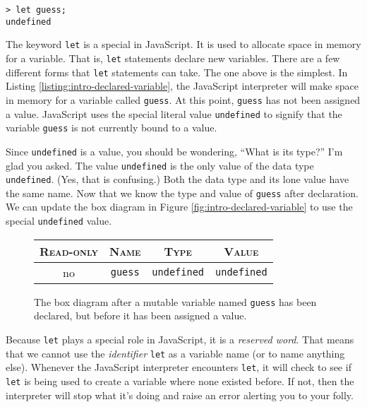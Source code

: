 \begin{lstlisting}[caption={\label{listing:intro-declared-variable} The NodeJS syntax to create a mutable variable named \texttt{guess}. The result is a value whose box diagram is \ref{fig:intro-declared-variable}.}]
> let guess;
undefined
\end{lstlisting}

The keyword \texttt{let} is a special in JavaScript. It is used to allocate space in memory for a variable. That is, \texttt{let} statements declare new variables. There are a few different forms that \texttt{let} statements can take. The one above is the simplest. In Listing \ref{listing:intro-declared-variable}, the JavaScript interpreter will make space in memory for a variable called \texttt{guess}. At this point, \texttt{guess} has not been assigned a value. JavaScript uses the special literal value \texttt{undefined} to signify that the variable \texttt{guess} is not currently bound to a value.

Since \texttt{undefined} is a value, you should be wondering, ``What is its type?'' I'm glad you asked. The value \texttt{undefined} is the only value of the data type \texttt{undefined}. (Yes, that is confusing.) Both the data type and its lone value have the same name. Now that we know the type and value of \texttt{guess} after declaration. We can update the box diagram in Figure \ref{fig:intro-declared-variable} to use the special \texttt{undefined} value.

\begin{figure}[h]
  \begin{tabular}{|c|c|c|c|}
    \hline
    \textsc{Read-only} & \textsc{Name} & \textsc{Type} & \textsc{Value}\\
    \hline
    no & \texttt{guess} & \texttt{undefined} & \texttt{undefined}\\
    \hline
  \end{tabular}
  \caption{\label{fig:intro-undefined-variable} The box diagram after a mutable variable named \texttt{guess} has been declared, but before it has been assigned a value.}
\end{figure}

Because \texttt{let} plays a special role in JavaScript, it is a \emph{reserved word}. That means that we cannot use the \emph{identifier} \texttt{let} as a variable name (or to name anything else).  Whenever the JavaScript interpreter encounters \texttt{let}, it will check to see if \texttt{let} is being used to create a variable where none existed before. If not, then the interpreter will stop what it's doing and raise an error alerting you to your folly.

